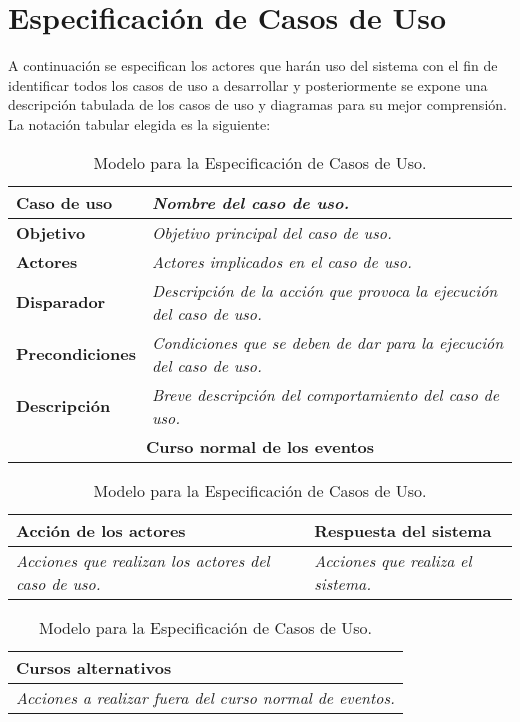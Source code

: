 \chapter{Especificación de Casos de Uso}
A continuación se especifican los actores que harán uso del sistema con el fin de identificar todos los casos de uso a desarrollar y posteriormente se
expone una descripción tabulada de los casos de uso y diagramas para su mejor comprensión.\\

La notación tabular elegida es la siguiente:
\begin{table}[!ht] %
   \centering
   \begin{tabular}{|p{4cm}|p{11.5cm}|}
      \hline
      \textbf{Caso de uso} & \textit{Nombre del caso de uso.}\\ \hline
      \textbf{Objetivo} & \textit{Objetivo principal del caso de uso.}\\ \hline
      \textbf{Actores} & \textit{Actores implicados en el caso de uso.}\\ \hline
      \textbf{Disparador} & \textit{Descripción de la acción que provoca la ejecución del caso de uso.}\\ \hline
      \textbf{Precondiciones} & \textit{Condiciones que se deben de dar para la ejecución del caso de uso.}\\ \hline
      \textbf{Descripción} & \textit{Breve descripción del comportamiento del caso de uso.}\\ \hline
      \multicolumn{2}{|c|}{\textbf{Curso normal de los eventos}}\\ \hline
   \end{tabular}
   \begin{tabular}{|p{7.75cm}|p{7.75cm}|}
      \hspace{2cm}\textbf{Acción de los actores} & \hspace{1.75cm}\textbf{Respuesta del sistema}\\ \hline
      \textit{Acciones que realizan los actores del caso de uso.} & \textit{Acciones que realiza el sistema.}\\ \hline
   \end{tabular}
   \begin{tabular}{|p{15.9cm}|}
      \hspace{6cm}\textbf{Cursos alternativos}\\ \hline
      \textit{Acciones a realizar fuera del curso normal de eventos.}\\ \hline
   \end{tabular}
   \caption{Modelo para la Especificación de Casos de Uso.}
\end{table}

